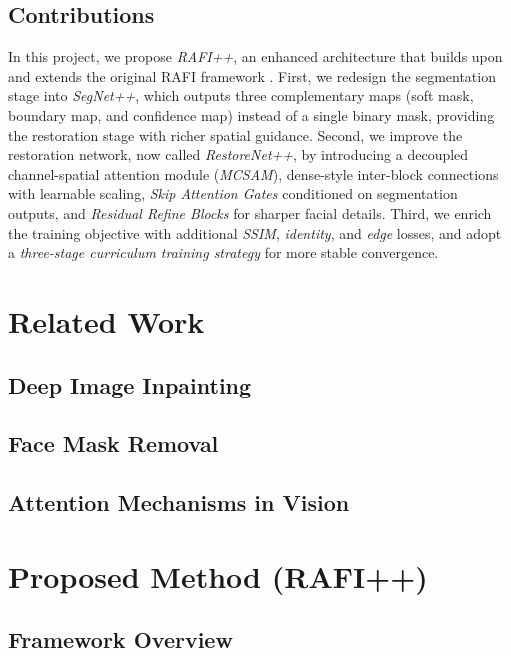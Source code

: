 \documentclass{ipgpmaster}
\begin{document}
\subsection{Contributions}
In this project, we propose \textit{RAFI++}, an enhanced architecture that builds upon and extends the original RAFI framework \cite{yang2024face}. First, we redesign the segmentation stage into \textit{SegNet++}, which outputs three complementary maps (soft mask, boundary map, and confidence map) instead of a single binary mask, providing the restoration stage with richer spatial guidance. Second, we improve the restoration network, now called \textit{RestoreNet++}, by introducing a decoupled channel-spatial attention module (\textit{MCSAM}), dense-style inter-block connections with learnable scaling, \textit{Skip Attention Gates} conditioned on segmentation outputs, and \textit{Residual Refine Blocks} for sharper facial details. Third, we enrich the training objective with additional \textit{SSIM}, \textit{identity}, and \textit{edge} losses, and adopt a \textit{three-stage curriculum training strategy} for more stable convergence.


\newpage
\section{Related Work}

\subsection{Deep Image Inpainting}

\subsection{Face Mask Removal}

\subsection{Attention Mechanisms in Vision}


\newpage
\section{Proposed Method (RAFI++)}

\subsection{Framework Overview}
\end{document}
